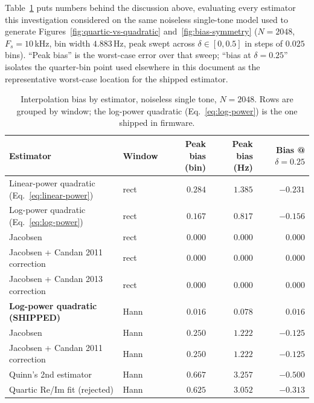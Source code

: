 \documentclass[11pt]{article}
\begin{document}
Table~\ref{tab:bias-comparison} puts numbers behind the discussion
above, evaluating every estimator this investigation considered on
the same noiseless single-tone model used to generate
Figures~\ref{fig:quartic-vs-quadratic} and~\ref{fig:bias-symmetry}
($N=2048$, $F_s=10\,$kHz, bin width $4.883\,$Hz, peak swept across
$\delta \in [0, 0.5]$ in steps of $0.025$ bins). ``Peak bias'' is the
worst-case error over that sweep; ``bias at $\delta=0.25$'' isolates
the quarter-bin point used elsewhere in this document as the
representative worst-case location for the shipped estimator.

\begin{table}[H]
  \centering
  \caption{Interpolation bias by estimator, noiseless single tone,
  $N=2048$. Rows are grouped by window; the log-power quadratic
  (Eq.~\eqref{eq:log-power}) is the one shipped in firmware.}
  \label{tab:bias-comparison}
  \begin{tabular}{llrrr}
    \toprule
    Estimator & Window & Peak bias (bin) & Peak bias (Hz) & Bias @ $\delta{=}0.25$ \\
    \midrule
    Linear-power quadratic (Eq.~\eqref{eq:linear-power})
      & rect & $0.284$  & $1.385$ & $-0.231$ \\
    Log-power quadratic (Eq.~\eqref{eq:log-power})
      & rect & $0.167$  & $0.817$ & $-0.156$ \\
    Jacobsen
      & rect & $0.000$  & $0.000$ & $0.000$ \\
    Jacobsen + Candan 2011 correction
      & rect & $0.000$  & $0.000$ & $0.000$ \\
    Jacobsen + Candan 2013 correction
      & rect & $0.000$  & $0.000$ & $0.000$ \\
    \midrule
    \textbf{Log-power quadratic (SHIPPED)}
      & Hann & $\mathbf{0.016}$ & $\mathbf{0.078}$ & $\mathbf{0.016}$ \\
    Jacobsen
      & Hann & $0.250$  & $1.222$ & $-0.125$ \\
    Jacobsen + Candan 2011 correction
      & Hann & $0.250$  & $1.222$ & $-0.125$ \\
    Quinn's 2nd estimator
      & Hann & $0.667$  & $3.257$ & $-0.500$ \\
    Quartic Re/Im fit (rejected)
      & Hann & $0.625$  & $3.052$ & $-0.313$ \\
    \bottomrule
  \end{tabular}
\end{table}
\end{document}
